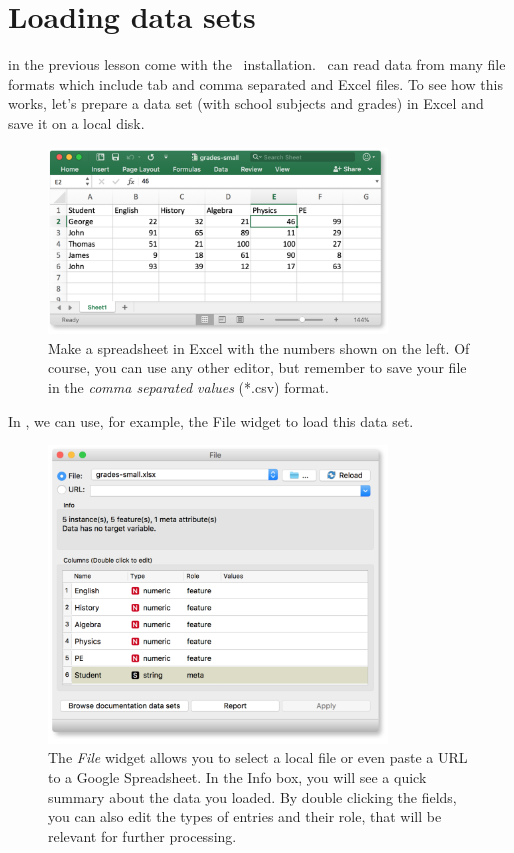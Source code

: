 \chapter{Loading data sets}
\label{ch:loading_data}

 in the previous lesson come with the \mutation\ installation. \mutation\ can read data from many file formats which include tab and comma separated and Excel files. To see how this works, let's prepare a data set (with school subjects and grades) in Excel and save it on a local disk.

\begin{figure}[h]
  \centering
  \includegraphics[width=90mm]{graphics/ch-loading_data/loading-fig1.png}%
  \caption{Make a spreadsheet in Excel with the numbers shown on the left. Of course, you can use any other editor, but remember to save your file in the \textit{comma separated values} (*.csv) format.}
  \label{fig:loading-fig1}
\end{figure}

In \mutation, we can use, for example, the File widget to load this data set.

\begin{figure}[h]
  \centering
  \includegraphics[width=90mm]{graphics/ch-loading_data/loading-fig2.png}%
  \caption{The \textit{File} widget allows you to select a local file or even paste a URL to a Google Spreadsheet. In the Info box, you will see a quick summary about the data you loaded. By double clicking the fields, you can also edit the types of entries and their role, that will be relevant for further processing.}
  \label{fig:loading-fig2}
\end{figure}

